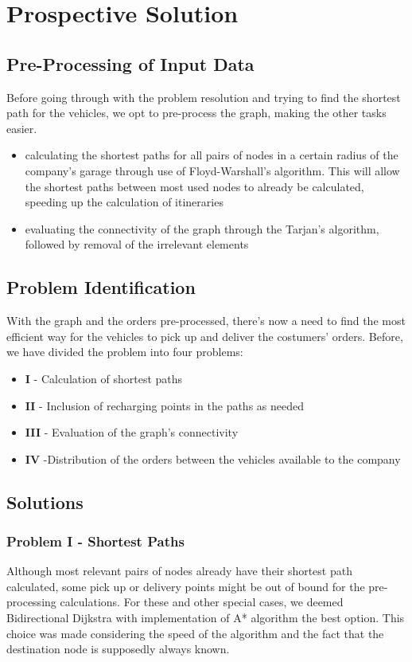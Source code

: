 \chapter{Prospective Solution}


\section{Pre-Processing of Input Data}
Before going through with the problem resolution and trying to find the shortest path for the vehicles, we opt to pre-process the graph, making the other tasks easier.

\begin{itemize}
    \item calculating the shortest paths for all pairs of nodes in a certain radius of the company's garage through use of Floyd-Warshall's algorithm. This will allow the shortest paths between most used nodes to already be calculated, speeding up the calculation of itineraries
    \item evaluating the connectivity of the graph through the Tarjan's algorithm,  followed by removal of the irrelevant elements
\end{itemize}


\section{Problem Identification}

With the graph and the orders pre-processed, there's now a need to find the most efficient way for the vehicles to pick up and deliver the costumers' orders. Before, we have divided the problem into four problems:
\begin{itemize}
    \item \textbf{I} - Calculation of shortest paths
    \item \textbf{II} - Inclusion of recharging points in the paths as needed
    \item \textbf{III} - Evaluation of the graph's connectivity
    \item \textbf{IV} -Distribution of the orders between the vehicles available to the company
\end{itemize}


\section{Solutions}

\subsection{Problem I - Shortest Paths}
Although most relevant pairs of nodes already have their shortest path calculated, some pick up or delivery points might be out of bound for the pre-processing calculations. For these and other special cases, we deemed Bidirectional Dijkstra with implementation of A* algorithm the best option. This choice was made considering the speed of the algorithm and the fact that the destination node is supposedly always known.

